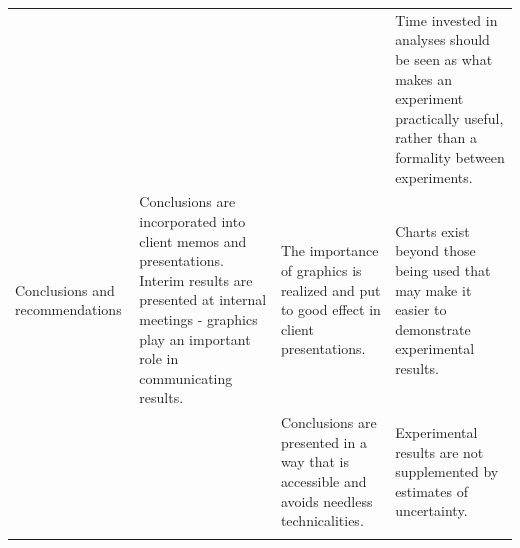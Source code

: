 \documentclass[11pt,a4paper,article]{memoir} %
\begin{document}
\begin{landscape}
{\begin{longtable}{p{4cm} p{7cm} p{6cm} p{6cm}}
 &  &  & Time invested in analyses should be seen as what makes an experiment practically useful, rather than a formality between experiments. \\ 
\cmidrule{1-4}
Conclusions and recommendations & Conclusions are incorporated into client memos and presentations. Interim results are presented at internal meetings - graphics play an important role in communicating results. & The importance of graphics is realized and put to good effect in client presentations. & Charts exist beyond those being used that may make it easier to demonstrate experimental results. \\ 
 &  & Conclusions are presented in a way that is accessible and avoids needless technicalities. & Experimental results are not supplemented by estimates of uncertainty. \\
\bottomrule
\label{tab:exp_procedure}
\end{longtable}
}
\end{landscape}
\end{document}
